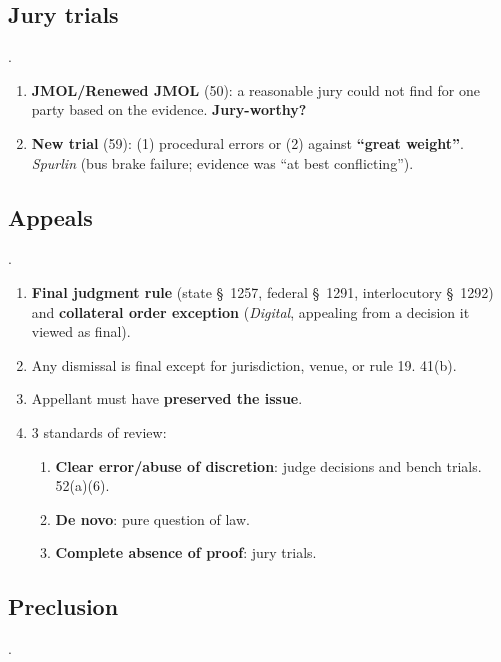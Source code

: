 \subsection{Jury trials}.

\begin{enumerate}
    \item \textbf{JMOL/Renewed JMOL} (50): a reasonable jury could not find 
    for one party based on the evidence. \textbf{Jury-worthy?}
    \item \textbf{New trial} (59): (1) procedural errors or (2) against 
    \textbf{``great weight''}. \emph{Spurlin} (bus brake failure; evidence was 
    ``at best conflicting'').
\end{enumerate}

\subsection{Appeals}.

\begin{enumerate}
    \item \textbf{Final judgment rule} (state \S\ 1257, federal \S\ 1291, 
    interlocutory \S\ 1292) and \textbf{collateral order exception} 
    (\emph{Digital}, appealing from a decision it viewed as final).
    \item Any dismissal is final except for jurisdiction, venue, or rule 19. 
    41(b).
    \item Appellant must have \textbf{preserved the issue}.
    \item 3 standards of review:
    \begin{enumerate}
        \item \textbf{Clear error/abuse of discretion}: judge decisions and 
        bench trials. 52(a)(6).
        \item \textbf{De novo}: pure question of law.
        \item \textbf{Complete absence of proof}: jury trials.
    \end{enumerate}
\end{enumerate}

\subsection{Preclusion}.

